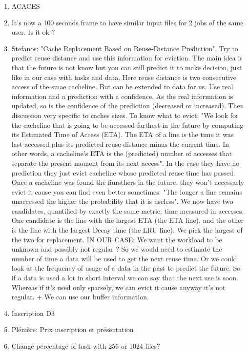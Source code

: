 \documentclass[a4paper]{article}
\begin{document}
	\begin{enumerate}
		\item ACACES
		\item It's now a 100 seconds frame to have similar input files for 2 jobs of the same user. Is it ok ?
		\item Stefanos: "Cache Replacement Based on Reuse-Distance Prediction". Try to predict reuse distance and use this information for eviction. The main idea is that the future is not know but you can still predict it to make decision, just like in our case with tasks and data. Here reuse distance is two consecutive access of the smae cacheline. But can be extended to data for us. Use real information and a prediction with a confidence. As the real information is updated, so is the confidence of the prediction (decreased or increased). Then discussion very specific to caches sizes. To know what to evict: "We look for the cacheline that is going to be accessed farthest in the future by computing its Estimated Time of Access (ETA). The ETA of a line is the time it was last accessed plus its predicted reuse-distance minus the current time. In other words, a cacheline’s ETA is the (predicted) number of accesses that separate the present moment from its next access". In the case they have no prediction they just evict cacheline whose predicted reuse time has passed. Once a cacheline was found the fiursthers in the future, they won't necessarly evict it cause you can find even better sometimes. "The longer a line remains unaccessed the higher the probability that it is useless". We now have two candidates, quantified by exactly the same metric: time measured in accesses. One candidate is the line with the largest ETA (the ETA line), and the other is the line with the largest Decay time (the LRU line). We pick the largest of the two for replacement. IN OUR CASE: We want the workload to be unknown and possibly not regular ? So we would need to estimate the number of time a data will be used to get the next reuse time. Or we could look at the frequency of usage of a data in the past to predict the future. So if a data is used a lot in short interval we can say that the next use is soon. Whereas if it's used only sparsely, we can evict it cause anyway it's not regular. + We can use our buffer information.
		\item Inscription D3
		\item Plénière: Prix inscription et présentation
		\item Change percentage of task with 256 or 1024 files? 
	\end{enumerate}
\end{document}
